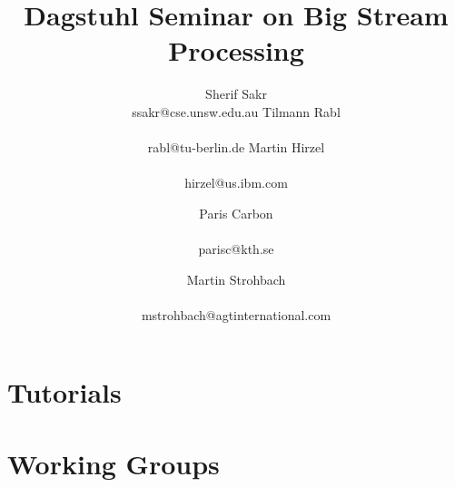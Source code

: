 \documentclass[preprint]{sig-alternate-10pt}
\begin{document}
\title{Dagstuhl Seminar on Big Stream Processing}

\newcommand*{\emailn}[1]{\textsf{\normalsize #1}}

\author{
\alignauthor
Sherif Sakr\\
  \emailn{ssakr@cse.unsw.edu.au}
\alignauthor
Tilmann Rabl\\
  \\
  \emailn{rabl@tu-berlin.de}
\alignauthor
Martin Hirzel\\
  \\
  \emailn{hirzel@us.ibm.com}
\and
\alignauthor
Paris Carbon\\
  \\
  \emailn{parisc@kth.se}
\and
\alignauthor
Martin Strohbach\\
  \\
  \emailn{mstrohbach@agtinternational.com}}


\maketitle



\section{Tutorials}



\section{Working Groups}




\balance

\end{document}
